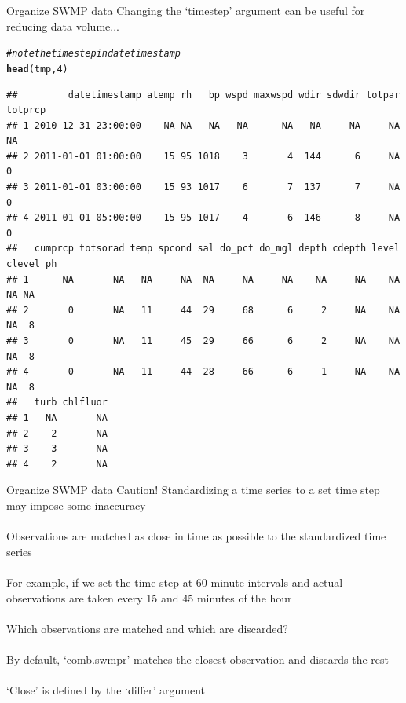 \documentclass[xcolor=svgnames]{beamer}\usepackage[]{graphicx}\usepackage[]{color}
\makeatletter
\newcommand{\hlnum}[1]{\textcolor[rgb]{0.686,0.059,0.569}{#1}}%
\newcommand{\hlcom}[1]{\textcolor[rgb]{0.678,0.584,0.686}{\textit{#1}}}%
\newcommand{\hlstd}[1]{\textcolor[rgb]{0.345,0.345,0.345}{#1}}%
\newcommand{\hlkwd}[1]{\textcolor[rgb]{0.737,0.353,0.396}{\textbf{#1}}}%
\newenvironment{kframe}{%
 \def\at@end@of@kframe{}%
 \ifinner\ifhmode%
  \def\at@end@of@kframe{\end{minipage}}%
  \begin{minipage}{\columnwidth}%
 \fi\fi%
 \def\FrameCommand##1{\hskip\@totalleftmargin \hskip-\fboxsep
 \colorbox{shadecolor}{##1}\hskip-\fboxsep
     \hskip-\linewidth \hskip-\@totalleftmargin \hskip\columnwidth}%
 \MakeFramed {\advance\hsize-\width
   \@totalleftmargin\z@ \linewidth\hsize
   \@setminipage}}%
 {\par\unskip\endMakeFramed%
 \at@end@of@kframe}
\newenvironment{knitrout}{}{} %
\makeatother
\begin{document}
\begin{frame}[containsverbatim]{Organize SWMP data}
Changing the `timestep' argument can be useful for reducing data volume...
\begin{knitrout}\scriptsize
{}\color{fgcolor}\begin{kframe}
\begin{alltt}
\hlcom{# note the time step in datetimestamp}
\hlkwd{head}\hlstd{(tmp,} \hlnum{4}\hlstd{)}
\end{alltt}
\begin{verbatim}
##         datetimestamp atemp rh   bp wspd maxwspd wdir sdwdir totpar totprcp
## 1 2010-12-31 23:00:00    NA NA   NA   NA      NA   NA     NA     NA      NA
## 2 2011-01-01 01:00:00    15 95 1018    3       4  144      6     NA       0
## 3 2011-01-01 03:00:00    15 93 1017    6       7  137      7     NA       0
## 4 2011-01-01 05:00:00    15 95 1017    4       6  146      8     NA       0
##   cumprcp totsorad temp spcond sal do_pct do_mgl depth cdepth level clevel ph
## 1      NA       NA   NA     NA  NA     NA     NA    NA     NA    NA     NA NA
## 2       0       NA   11     44  29     68      6     2     NA    NA     NA  8
## 3       0       NA   11     45  29     66      6     2     NA    NA     NA  8
## 4       0       NA   11     44  28     66      6     1     NA    NA     NA  8
##   turb chlfluor
## 1   NA       NA
## 2    2       NA
## 3    3       NA
## 4    2       NA
\end{verbatim}
\end{kframe}
\end{knitrout}
\end{frame}

\begin{frame}[containsverbatim]{Organize SWMP data}
\alert{Caution!} Standardizing a time series to a set time step may impose some inaccuracy \\~\\
Observations are matched as close in time as possible to the standardized time series \\~\\
For example, if we set the time step at 60 minute intervals and actual observations are taken every 15 and 45 minutes of the hour \\~\\
Which observations are matched and which are discarded? \\~\\
By default, `comb.swmpr' matches the closest observation and discards the rest \\~\\
`Close' is defined by the `differ' argument
\end{frame}
\end{document}
